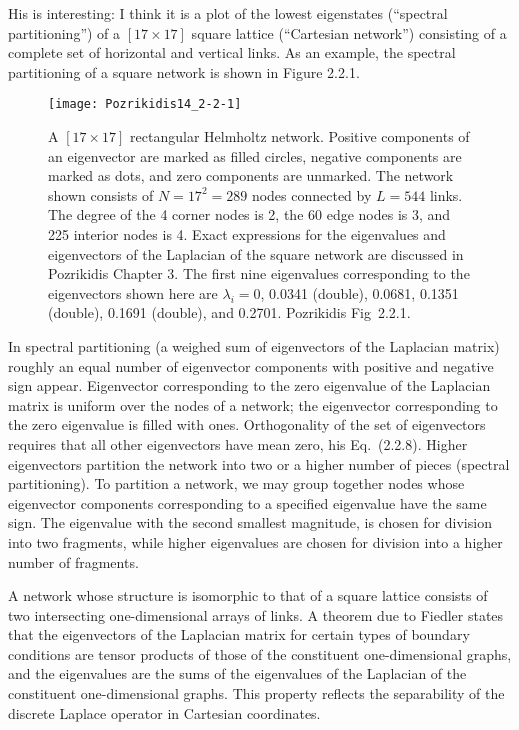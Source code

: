 \begin{description}
His  is interesting: I think it is a plot of
the lowest eigenstates (``spectral partitioning'') of a $[17\times17]$
square lattice (``Cartesian network'') consisting of a complete set
of horizontal and vertical links.
As an example, the spectral partitioning of a square network is shown in
Figure 2.2.1.
\begin{figure}
  \centering
  \texttt{[image: Pozrikidis14\_2-2-1]}
  \caption{\label{fig:Pozrikidis14_2-2-1}
A $[17\times17]$ rectangular Helmholtz 
network. Positive components of an eigenvector are marked as filled
circles, negative components are marked as dots, and zero components are
unmarked. The network shown consists of $N=17^2=289$ nodes connected by
$L=544$ links. The degree of the 4 corner nodes is 2, the 60 edge nodes
is 3, and 225 interior nodes is 4. Exact expressions for the eigenvalues
and eigenvectors of the Laplacian of the square network are discussed in
Pozrikidis Chapter 3. The first nine eigenvalues corresponding to the
eigenvectors shown here are $\lambda_i=0$, 0.0341 (double), 0.0681,
0.1351 (double), 0.1691 (double), and 0.2701.
Pozrikidis Fig~2.2.1.
  }
\end{figure}

In
spectral partitioning (a weighed
sum of eigenvectors of the Laplacian matrix)
roughly an equal number of eigenvector components with positive
and negative sign appear.
Eigenvector corresponding to the zero eigenvalue of the Laplacian matrix
is uniform over the nodes of a network; the eigenvector corresponding to
the zero eigenvalue is filled with ones. Orthogonality of the set of
eigenvectors requires that all other eigenvectors have mean zero, his
Eq.~(2.2.8). Higher eigenvectors partition the network into two or a
higher number of pieces (spectral partitioning). To partition a network,
we may group together nodes whose eigenvector components corresponding to
a specified eigenvalue have the same sign. The eigenvalue with the second
smallest magnitude, is chosen for division into two fragments, while
higher eigenvalues are chosen for division into a higher number of
fragments.

A network whose structure is isomorphic to that of a square lattice
consists of two intersecting one-dimensional arrays of links. A theorem
due to Fiedler states that the eigenvectors of the
Laplacian matrix for certain types of boundary conditions are tensor
products of those of the constituent one-dimensional graphs, and the
eigenvalues are the sums of the eigenvalues of the Laplacian of the
constituent one-dimensional graphs. This property reflects the
separability of the discrete Laplace operator in Cartesian coordinates.


\end{description}
